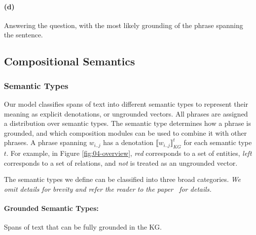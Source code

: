 \documentclass[main.tex]{subfiles}
\begin{document}
\paragraph{(d)} Answering the question, with the most likely grounding of the phrase spanning the sentence.


\subsection{Compositional Semantics}
\subsubsection{Semantic Types}
\label{sssec:semtype}
Our model classifies spans of text into different semantic types to represent their meaning as explicit denotations, or ungrounded vectors.
All phrases are assigned a distribution over semantic types.
The semantic type determines how a phrase is grounded, and which composition modules can be used to combine it with other phrases.
A phrase spanning $w_{i..j}$ has a denotation $\llbracket w_{i..j} \rrbracket_{KG}^{t}$ for each semantic type $t$.
For example, in Figure \ref{fig:04-overview}, \emph{red} corresponds to a set of entities, \emph{left} corresponds to a set of relations, and \emph{not} is treated as an ungrounded vector. %

The semantic types we define can be classified into three broad categories. \textit{We omit details for brevity and refer the reader to the paper~\cite{gupta-ncds-2018} for details.}

\paragraph{Grounded Semantic Types:} Spans of text that can be fully grounded in the KG. %
\end{document}

